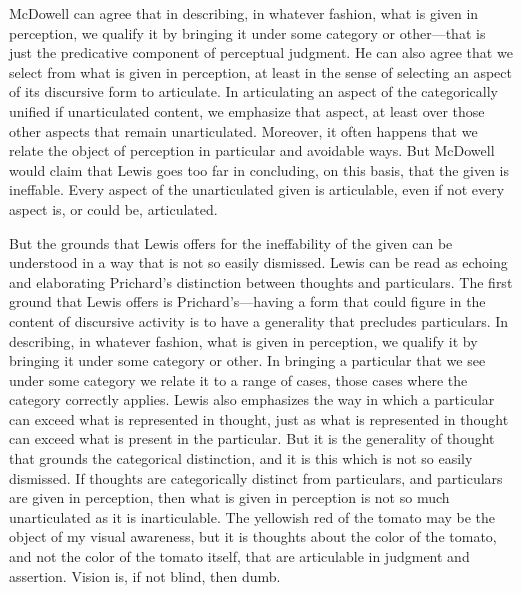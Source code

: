 \documentclass[12pt]{article}
\begin{document}
McDowell can agree that in describing, in whatever fashion, what is given in perception, we qualify it by bringing it under some category or other---that is just the predicative component of perceptual judgment. He can also agree that we select from what is given in perception, at least in the sense of selecting an aspect of its discursive form to articulate. In articulating an aspect of the categorically unified if unarticulated content, we emphasize that aspect, at least over those other aspects that remain unarticulated. Moreover, it often happens that we relate the object of perception in particular and avoidable ways. But McDowell would claim that Lewis goes too far in concluding, on this basis, that the given is ineffable. Every aspect of the unarticulated given is articulable, even if not every aspect is, or could be, articulated.

But the grounds that Lewis offers for the ineffability of the given can be understood in a way that is not so easily dismissed. Lewis can be read as echoing and elaborating Prichard's distinction between thoughts and particulars. The first ground that Lewis offers is Prichard's---having a form that could figure in the content of discursive activity is to have a generality that precludes particulars. In describing, in whatever fashion, what is given in perception, we qualify it by bringing it under some category or other. In bringing a particular that we see under some category we relate it to a range of cases, those cases where the category correctly applies. Lewis also emphasizes the way in which a particular can exceed what is represented in thought, just as what is represented in thought can exceed what is present in the particular. But it is the generality of thought that grounds the categorical distinction, and it is this which is not so easily dismissed. If thoughts are categorically distinct from particulars, and particulars are given in perception, then what is given in perception is not so much unarticulated as it is inarticulable. The yellowish red of the tomato may be the object of my visual awareness, but it is thoughts about the color of the tomato, and not the color of the tomato itself, that are articulable in judgment and assertion. Vision is, if not blind, then dumb.
\end{document}
